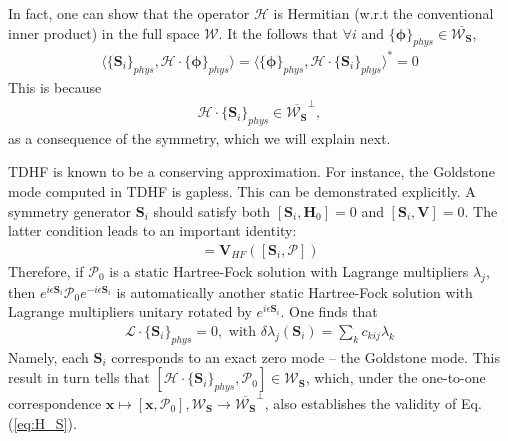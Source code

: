 \begin{subappendices}
    In fact, one can show that the operator $\boldsymbol{\mathcal H}$ is Hermitian (w.r.t the conventional inner product) in the full space $\boldsymbol{\mathcal W}$. It the follows that $\forall i$ and $\{\boldsymbol\phi\}_{phys}\in \overline{\boldsymbol{\mathcal W}_{\mathbf S}}$,
    \begin{align}
        \langle \{\mathbf S_i\}_{phys},\boldsymbol{\mathcal H} \cdot \{\boldsymbol\phi\}_{phys}\rangle=\langle \{\boldsymbol\phi\}_{phys},\boldsymbol{\mathcal H} \cdot \{\mathbf S_i\}_{phys} \rangle^*=0
    \end{align}
    This is because
    \begin{align}
        \boldsymbol{\mathcal H} \cdot \{\mathbf S_i\}_{phys} \in \overline{\boldsymbol{\mathcal W}_{\mathbf S}}^\perp,\label{eq:H_S}
    \end{align}
    as a consequence of the symmetry, which we will explain next.

    TDHF is known to be a conserving approximation. For instance, the Goldstone mode computed in TDHF is gapless. This can be demonstrated explicitly. A symmetry generator $\mathbf S_i$ should satisfy both $[\mathbf S_i,\mathbf H_0]=0$ and $[\mathbf S_i,\mathbf V]=0$. The latter condition leads to an important identity:
    \begin{align}
        [\mathbf S_i,\mathbf V_{HF}(\boldsymbol{\mathcal P})]=\mathbf V_{HF}([\mathbf S_i,\boldsymbol{\mathcal P}])
    \end{align}
    Therefore, if $\boldsymbol{\mathcal P}_0$ is a static Hartree-Fock solution with Lagrange multipliers $\lambda_j$, then $e^{i\epsilon \mathbf S_i}\boldsymbol{\mathcal P}_0 e^{-i\epsilon \mathbf S_i}$ is automatically another static Hartree-Fock solution with Lagrange multipliers unitary rotated by $e^{i\epsilon \mathbf S_i}$. One finds that
    \begin{align}
        \boldsymbol{\mathcal L}\cdot\{\mathbf S_i\}_{phys}=0, \text{ with } \delta\lambda_j(\mathbf S_i)=\sum_k c_{kij}\lambda_k
    \end{align}
    Namely, each $\mathbf S_i$ corresponds to an exact zero mode -- the Goldstone mode. This result in turn tells that $[\boldsymbol{\mathcal H} \cdot \{\mathbf S_i\}_{phys},\boldsymbol{\mathcal P}_0]\in\boldsymbol{\mathcal W}_{\mathbf S}$, which, under the one-to-one correspondence $\mathbf x\mapsto[\mathbf x,\boldsymbol{\mathcal P}_0], \boldsymbol{\mathcal W}_{\mathbf S}\rightarrow\overline{\boldsymbol{\mathcal W}_{\mathbf S}}^\perp$, also establishes the validity of Eq.(\ref{eq:H_S}).


\end{subappendices}
